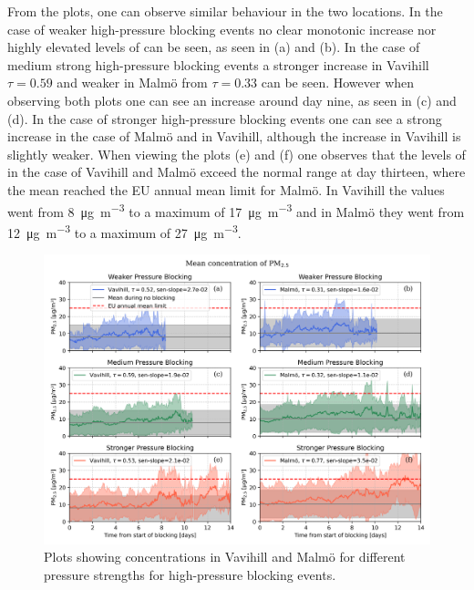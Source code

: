 From the plots, one can observe similar behaviour in the two locations. In the case of weaker high-pressure blocking events no clear monotonic increase nor highly elevated levels of \PM can be seen, as seen in (a) and (b). In the case of medium strong high-pressure blocking events a stronger increase in Vavihill $\tau=0.59$ and weaker in Malmö from $\tau=0.33$ can be seen. However when observing both plots one can see an increase around day nine, as seen in (c) and (d). In the case of stronger high-pressure blocking events one can see a strong increase in the case of Malmö and in Vavihill, although the increase in Vavihill is slightly weaker. When viewing the plots (e) and (f) one observes that the levels of \PM in the case of Vavihill and Malmö exceed the normal range at day thirteen, where the mean reached the EU annual mean limit for Malmö. In Vavihill the values went from \SI{8}{\micro\gram\per\meter\cubed} to a maximum of \SI{17}{\micro\gram\per\meter\cubed} and in Malmö they went from \SI{12}{\micro\gram\per\meter\cubed} to a maximum of \SI{27}{\micro\gram\per\meter\cubed}. 


\begin{figure}[H]
        \centering
        \includegraphics[width=\textwidth]{Figures/Meanplot_pressure.png}
        \caption{Plots showing \PM concentrations in Vavihill and Malmö for different pressure strengths for high-pressure blocking events.}
        \label{fig:Meanplot_pressure}
\end{figure}

 

